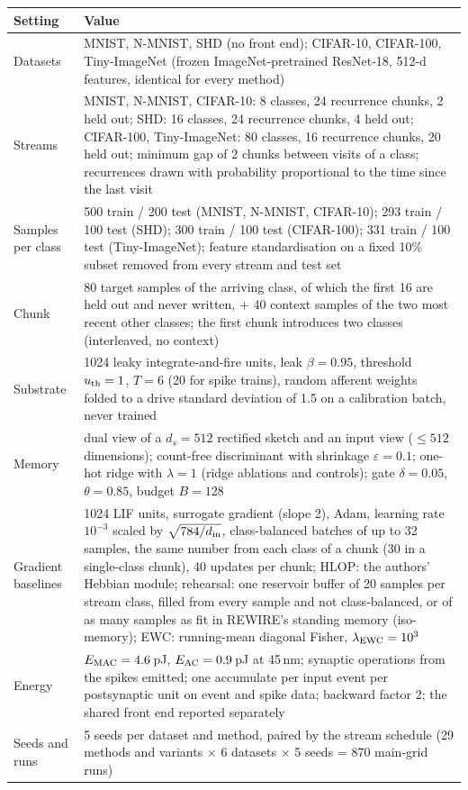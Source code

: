 \begin{tabular}{p{}p{}}
\toprule
Setting & Value \\
\midrule
Datasets & MNIST, N-MNIST, SHD (no front end); CIFAR-10, CIFAR-100, Tiny-ImageNet (frozen ImageNet-pretrained ResNet-18, 512-d features, identical for every method) \\
Streams & MNIST, N-MNIST, CIFAR-10: 8 classes, 24 recurrence chunks, 2 held out; SHD: 16 classes, 24 recurrence chunks, 4 held out; CIFAR-100, Tiny-ImageNet: 80 classes, 16 recurrence chunks, 20 held out; minimum gap of 2 chunks between visits of a class; recurrences drawn with probability proportional to the time since the last visit \\
Samples per class & 500 train / 200 test (MNIST, N-MNIST, CIFAR-10); 293 train / 100 test (SHD); 300 train / 100 test (CIFAR-100); 331 train / 100 test (Tiny-ImageNet); feature standardisation on a fixed 10\% subset removed from every stream and test set \\
Chunk & 80 target samples of the arriving class, of which the first 16 are held out and never written, + 40 context samples of the two most recent other classes; the first chunk introduces two classes (interleaved, no context) \\
Substrate & 1024 leaky integrate-and-fire units, leak $\beta=0.95$, threshold $u_{\rm th}=1$, $T=6$ (20 for spike trains), random afferent weights folded to a drive standard deviation of 1.5 on a calibration batch, never trained \\
Memory & dual view of a $d_s=512$ rectified sketch and an input view ($\le512$ dimensions); count-free discriminant with shrinkage $\varepsilon=0.1$; one-hot ridge with $\lambda=1$ (ridge ablations and controls); gate $\delta=0.05$, $\theta=0.85$, budget $B=128$ \\
Gradient baselines & 1024 LIF units, surrogate gradient (slope 2), Adam, learning rate $10^{-3}$ scaled by $\sqrt{784/d_{\rm in}}$, class-balanced batches of up to 32 samples, the same number from each class of a chunk (30 in a single-class chunk), 40 updates per chunk; HLOP: the authors' Hebbian module; rehearsal: one reservoir buffer of 20 samples per stream class, filled from every sample and not class-balanced, or of as many samples as fit in REWIRE's standing memory (iso-memory); EWC: running-mean diagonal Fisher, $\lambda_{\rm EWC}=10^3$ \\
Energy & $E_{\rm MAC}=4.6$\,pJ, $E_{\rm AC}=0.9$\,pJ at 45\,nm; synaptic operations from the spikes emitted; one accumulate per input event per postsynaptic unit on event and spike data; backward factor 2; the shared front end reported separately \\
Seeds and runs & 5 seeds per dataset and method, paired by the stream schedule (29 methods and variants $\times$ 6 datasets $\times$ 5 seeds = 870 main-grid runs) \\
\bottomrule
\end{tabular}
